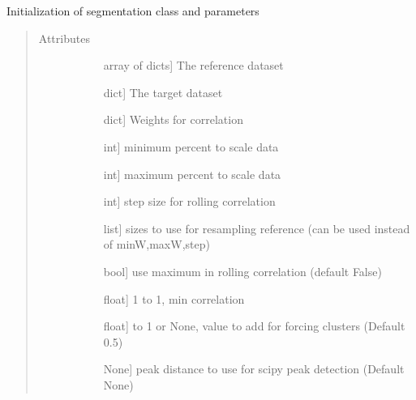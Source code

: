 \documentclass[letterpaper,10pt,english]{sphinxmanual}
\begin{document}
\begin{fulllineitems}
\begin{fulllineitems}
\label{\detokenize{generated/seg1d.Segmenter:seg1d.Segmenter.__init__}}
\sphinxAtStartPar
Initialization of segmentation class and parameters
\begin{quote}\begin{description}
\item[{Attributes}] \leavevmode\begin{description}
\item[{}] \leavevmode{[}array of dicts{]}
\sphinxAtStartPar
The reference dataset

\item[{}] \leavevmode{[}dict{]}
\sphinxAtStartPar
The target dataset

\item[{}] \leavevmode{[}dict{]}
\sphinxAtStartPar
Weights for correlation

\item[{}] \leavevmode{[}int{]}
\sphinxAtStartPar
minimum percent to scale data

\item[{}] \leavevmode{[}int{]}
\sphinxAtStartPar
maximum percent to scale data

\item[{}] \leavevmode{[}int{]}
\sphinxAtStartPar
step size for rolling correlation

\item[{}] \leavevmode{[}list{]}
\sphinxAtStartPar
sizes to use for resampling reference
(can be used instead of minW,maxW,step)

\item[{}] \leavevmode{[}bool{]}
\sphinxAtStartPar
use maximum in rolling correlation (default False)

\item[{}] \leavevmode{[}float{]}
\sphinxAtStartPar
\sphinxhyphen{}1 to 1, min correlation

\item[{}] \leavevmode{[}float{]}
 to 1 or None, value to add for forcing clusters (Default 0.5)

\item[{}] \leavevmode{[}None{]}
\sphinxAtStartPar
peak distance to use for scipy peak detection (Default None)


\end{description}
\end{description}
\end{quote}
\end{fulllineitems}
\end{fulllineitems}
\end{document}

